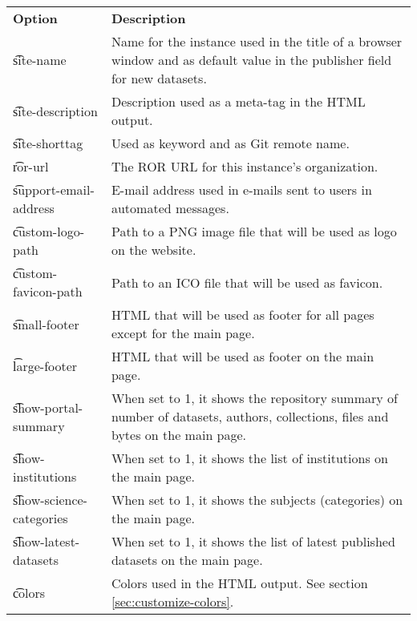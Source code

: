 \begin{tabularx}{\textwidth}{*{1}{!{\VRule[-1pt]}l}!{\VRule[-1pt]}X}
  \headrow
  \textbf{Option}             & \textbf{Description}\\
  \t{site-name}               & Name for the instance used in the title of a
                                browser window and as default value in the
                                publisher field for new datasets.\\
  \t{site-description}        & Description used as a meta-tag in the HTML
                                output.\\
  \t{site-shorttag}           & Used as keyword and as Git remote name.\\
  \t{ror-url}                 & The ROR URL for this instance's organization.\\
  \t{support-email-address}   & E-mail address used in e-mails sent to users
                                in automated messages.\\
  \t{custom-logo-path}        & Path to a PNG image file that will be used as
                                logo on the website.\\
  \t{custom-favicon-path}     & Path to an ICO file that will be used as
                                favicon.\\
  \t{small-footer}            & HTML that will be used as footer for all
                                pages except for the main page.\\
  \t{large-footer}            & HTML that will be used as footer on the
                                main page.\\
  \t{show-portal-summary}     & When set to 1, it shows the repository summary
                                of number of datasets, authors, collections,
                                files and bytes on the main page.\\
  \t{show-institutions}       & When set to 1, it shows the list of
                                institutions on the main page.\\
  \t{show-science-categories} & When set to 1, it shows the subjects
                                (categories) on the main page.\\
  \t{show-latest-datasets}    & When set to 1, it shows the list of latest
                                published datasets on the main page.\\
  \t{colors}                  & Colors used in the HTML output. See section
                                \ref{sec:customize-colors}.
\end{tabularx}

